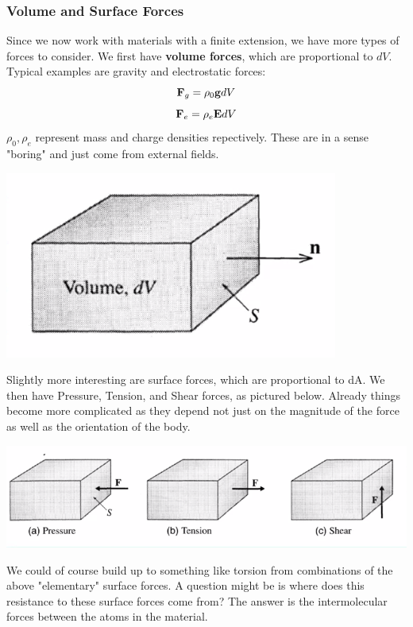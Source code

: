 \documentclass[../PHYS306Notes.tex]{subfiles}
\begin{document}
\subsubsection{Volume and Surface Forces}
Since we now work with materials with a finite extension, we have more types of forces to consider. We first have \textbf{volume forces}, which are proportional to $dV$. Typical examples are gravity and electrostatic forces:
\[\mathbf{F}_g = \rho_0 \mathbf{g}dV\]
\[\mathbf{F}_e = \rho_e \mathbf{E}dV\]
$\rho_0, \rho_e$ represent mass and charge densities repectively. These are in a sense "boring" and just come from external fields.
\begin{center}
    \includegraphics[scale=0.9]{Lecture-30/l30-img4.png}
\end{center}
Slightly more interesting are surface forces, which are proportional to dA. We then have Pressure, Tension, and Shear forces, as pictured below. Already things become more complicated as they depend not just on the magnitude of the force as well as the orientation of the body. 
\begin{center}
    \includegraphics[scale=0.9]{Lecture-30/l30-img5.png}
\end{center}
We could of course build up to something like torsion from combinations of the above "elementary" surface forces.
\newline A question might be is where does this resistance to these surface forces come from? The answer is the intermolecular forces between the atoms in the material. 
\end{document}
